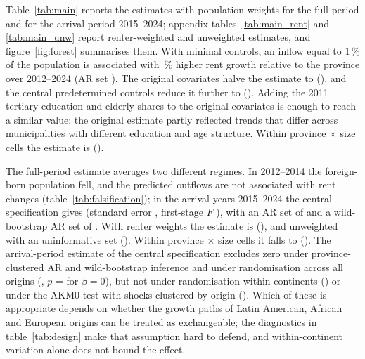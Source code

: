 \documentclass[11pt,a4paper]{article}
\begin{document}
Table~\ref{tab:main} reports the estimates with population weights for the full period and for the arrival period 2015--2024; appendix tables~\ref{tab:main_rent} and \ref{tab:main_unw} report renter-weighted and unweighted estimates, and figure~\ref{fig:forest} summarises them. With minimal controls, an inflow equal to 1\,\% of the population is associated with \minFullB\,\% higher rent growth relative to the province over 2012--2024 (AR set \minFullAR). The original covariates halve the estimate to \origFullB{} (\origFullAR), and the central predetermined controls reduce it further to \cenFullB{} (\cenFullAR). Adding the 2011 tertiary-education and elderly shares to the original covariates is enough to reach a similar value: the original estimate partly reflected trends that differ across municipalities with different education and age structure. Within province $\times$ size cells the estimate is \sizeFullB{} (\sizeFullAR).



The full-period estimate averages two different regimes. In 2012--2014 the foreign-born population fell, and the predicted outflows are not associated with rent changes (table~\ref{tab:falsification}); in the arrival years 2015--2024 the central specification gives \cenArrB{} (standard error \cenArrSe, first-stage $F$ \cenArrF), with an AR set of \cenArrAR{} and a wild-bootstrap AR set of \cenArrWCR. With renter weights the estimate is \cenArrRB{} (\cenArrRAR), and unweighted \cenArrUB{} with an uninformative set (\cenArrUAR). Within province $\times$ size cells it falls to \sizeArrB{} (\sizeArrAR). The arrival-period estimate of the central specification excludes zero under province-clustered AR and wild-bootstrap inference and under randomisation across all origins (\cenArrRI, $p$ = \cenArrRIp{} for $\beta=0$), but not under randomisation within continents (\cenArrRIcont) or under the AKM0 test with shocks clustered by origin (\cenArrAKM). Which of these is appropriate depends on whether the growth paths of Latin American, African and European origins can be treated as exchangeable; the diagnostics in table~\ref{tab:design} make that assumption hard to defend, and within-continent variation alone does not bound the effect.
\end{document}
